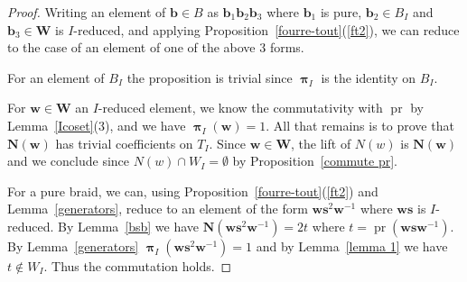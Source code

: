 \documentclass{amsart}
\numberwithin{equation}{section}
\newcommand\inv{^{-1}}
\newcommand\bb{{\mathbf b}}
\newcommand\bs{{\mathbf s}}
\newcommand\bw{{\mathbf w}}
\newcommand\bN{{\mathbf N}}
\newcommand\bW{{\mathbf W}}
\DeclareMathOperator\pr{pr}
\DeclareMathOperator\bpi{\boldsymbol\pi}
\begin{document}
\begin{proof}
Writing  an element  of $\bb\in  B$ as  $\bb_1\bb_2\bb_3$ where  $\bb_1$ is
pure,  $\bb_2\in B_I$ and $\bb_3\in\bW$  is $I$-reduced,
 and applying Proposition~\ref{fourre-tout}(\ref{ft2}), we can reduce to the case of an element
of one of the above 3 forms.

For an element of $B_I$ the proposition is trivial since $\bpi_I$ is the
identity on $B_I$.

For $\bw\in\bW$  an $I$-reduced element, we know the 
commutativity with $\pr$ by Lemma~\ref{Icoset}(3),
and we have $\bpi_I(\bw)=1$. All that remains is to prove that $\bN(\bw)$ has trivial
coefficients on $T_I$. Since $\bw\in\bW$,  the lift of $N(w)$ is $\bN(\bw)$
and we conclude since $N(w)\cap W_I=\emptyset$ by Proposition~\ref{commute
pr}.

For  a  pure  braid,  we  can,  using
Proposition~\ref{fourre-tout}(\ref{ft2}) and Lemma~\ref{generators}, reduce to an element of the form $\bw\bs^2\bw\inv$
where $\bw\bs$ is $I$-reduced.
By Lemma~\ref{bsb} we have $\bN(\bw\bs^2\bw\inv)=2t$ where
 $t=\pr(\bw\bs\bw\inv)$.
By Lemma~\ref{generators} $\bpi_I(\bw\bs^2\bw\inv)=1$
and by Lemma~\ref{lemma 1} we have $t\notin W_I$.
Thus the commutation holds.
\end{proof}
\end{document}
